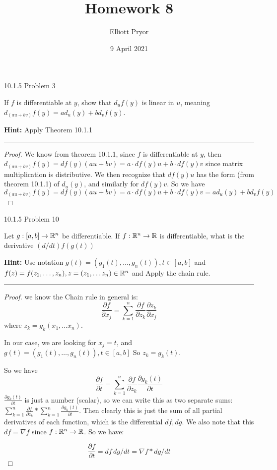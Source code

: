 \documentclass[11pt]{article}
\title{Homework 8}
\author{Elliott Pryor}
\date{9 April 2021}
\begin{document}
\maketitle

 10.1.5 Problem 3

If $f$ is differentiable at $y$, show that $d_uf(y)$ is linear in $u$,
meaning $d_{(au + bv)}f(y) = a d_u(y) + b d_v f(y)$.

\textbf{Hint:} Apply Theorem 10.1.1

\hrule


\begin{proof}
    
    We know from theorem 10.1.1, since $f$ is differentiable at $y$, then
    $d_{(au + bv)}f(y) = df(y) (au + bv) = a \cdot df(y) u + b \cdot df(y)  v$
    since matrix multiplication is distributive. 
    We then recognize that $df(y) u$ has the form (from theorem 10.1.1) of $d_u(y)$,
    and similarly for $df(y) v$. So we have 
    $d_{(au + bv)}f(y) = df(y) (au + bv) = a \cdot df(y) u + b \cdot df(y)  v = a d_u(y) + b d_v f(y)$
\end{proof}





 10.1.5 Problem 10

Let $g : [a,b] \to \mathbb{R}^n$ be differentiable. If $f : \mathbb{R}^n \to \mathbb{R}$ is differentiable,
what is the derivative $(d/dt)f(g(t))$

\textbf{Hint:} Use notation $g(t) = (g_1(t), \dots, g_n(t)), t \in [a,b]$
and $f(z) = f(z_1, \dots, z_n), z = (z_1, \dots z_n) \in \mathbb{R}^n$ and Apply
the chain rule.

\hrule


\begin{proof}
    
    we know the Chain rule in general is: 
    $$\frac{\partial f}{\partial x_j} = \sum_{k = 1} ^n \frac{\partial f}{\partial z_k} \frac{\partial z_k}{\partial x_j}$$
    where $z_k = g_k(x_1, \dots x_n)$.

    In our case, we are looking for $x_j = t$, and $g(t) = (g_1(t), \dots, g_n(t)), t \in [a,b]$
    So $z_k = g_k(t)$.

    So we have 
    $$\frac{\partial f}{\partial t} = \sum_{k = 1} ^n \frac{\partial f}{\partial z_k} \frac{\partial g_k(t)}{\partial t}$$
    $\frac{\partial g_k(t)}{\partial t}$ is just a number (scalar), so we can write this as two separate sums:
    $\sum_{k = 1} ^n \frac{\partial f}{\partial z_k} * \sum_{k = 1} ^n \frac{\partial g_k(t)}{\partial t}$.
    Then clearly this is just the sum of all partial derivatives of each function, which is the differential $df, dg$.
    We also note that this $df = \nabla f$ since $f: \mathbb{R} ^n \to \mathbb{R}$.
    So we have:

    $$\frac{\partial f}{\partial t} = df \, dg/dt = \nabla f * dg/dt$$

\end{proof}
\end{document}
